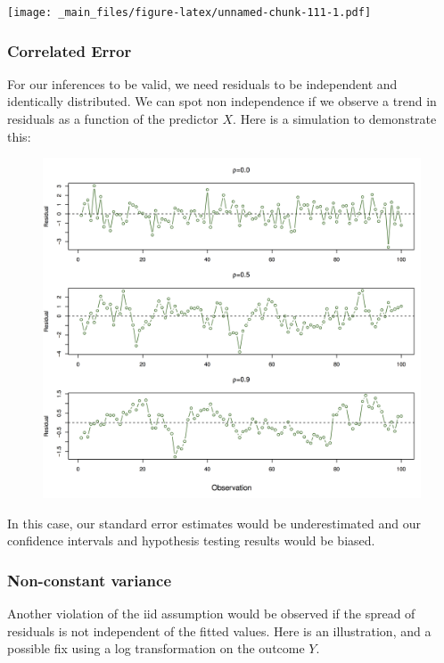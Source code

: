 \documentclass[]{article}
\theoremstyle{definition}
\theoremstyle{definition}
\theoremstyle{remark}
\begin{document}
\texttt{[image: \_main\_files/figure-latex/unnamed-chunk-111-1.pdf]}

\subsubsection{Correlated Error}\label{correlated-error}

For our inferences to be valid, we need residuals to be independent and
identically distributed. We can spot non independence if we observe a
trend in residuals as a function of the predictor \(X\). Here is a
simulation to demonstrate this:

\begin{figure}[htbp]
\centering
\includegraphics{img/correlated_error.png}
\caption{}
\end{figure}

In this case, our standard error estimates would be underestimated and
our confidence intervals and hypothesis testing results would be biased.

\subsubsection{Non-constant variance}\label{non-constant-variance}

Another violation of the iid assumption would be observed if the spread
of residuals is not independent of the fitted values. Here is an
illustration, and a possible fix using a log transformation on the
outcome \(Y\).
\end{document}
